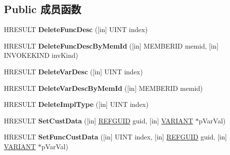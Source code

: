 \subsection*{Public 成员函数}
\begin{DoxyCompactItemize}
\item 
\mbox{\label{interface_i_create_type_info2_aff00ee6ebc79fa394288c17fcb8c0e08}} 
H\+R\+E\+S\+U\+LT {\bfseries Delete\+Func\+Desc} (\mbox{[}in\mbox{]} U\+I\+NT index)
\item 
\mbox{\label{interface_i_create_type_info2_a234f9b5e082de22db7f1b706aea32964}} 
H\+R\+E\+S\+U\+LT {\bfseries Delete\+Func\+Desc\+By\+Mem\+Id} (\mbox{[}in\mbox{]} M\+E\+M\+B\+E\+R\+ID memid, \mbox{[}in\mbox{]} I\+N\+V\+O\+K\+E\+K\+I\+ND inv\+Kind)
\item 
\mbox{\label{interface_i_create_type_info2_abe46aa69733e20059d33f987c8875ca0}} 
H\+R\+E\+S\+U\+LT {\bfseries Delete\+Var\+Desc} (\mbox{[}in\mbox{]} U\+I\+NT index)
\item 
\mbox{\label{interface_i_create_type_info2_a057efad7859c3f871d2eca8b4b846f03}} 
H\+R\+E\+S\+U\+LT {\bfseries Delete\+Var\+Desc\+By\+Mem\+Id} (\mbox{[}in\mbox{]} M\+E\+M\+B\+E\+R\+ID memid)
\item 
\mbox{\label{interface_i_create_type_info2_aee4b98e8a6a914bcd69d3650010afad2}} 
H\+R\+E\+S\+U\+LT {\bfseries Delete\+Impl\+Type} (\mbox{[}in\mbox{]} U\+I\+NT index)
\item 
\mbox{\label{interface_i_create_type_info2_a72c9a3d0d7e0fff408cf9f64ad4cd934}} 
H\+R\+E\+S\+U\+LT {\bfseries Set\+Cust\+Data} (\mbox{[}in\mbox{]} \hyperlink{struct___g_u_i_d}{R\+E\+F\+G\+U\+ID} guid, \mbox{[}in\mbox{]} \hyperlink{structtag_v_a_r_i_a_n_t}{V\+A\+R\+I\+A\+NT} $\ast$p\+Var\+Val)
\item 
\mbox{\label{interface_i_create_type_info2_adbe03656be46050f7600d06eeca0e4b6}} 
H\+R\+E\+S\+U\+LT {\bfseries Set\+Func\+Cust\+Data} (\mbox{[}in\mbox{]} U\+I\+NT index, \mbox{[}in\mbox{]} \hyperlink{struct___g_u_i_d}{R\+E\+F\+G\+U\+ID} guid, \mbox{[}in\mbox{]} \hyperlink{structtag_v_a_r_i_a_n_t}{V\+A\+R\+I\+A\+NT} $\ast$p\+Var\+Val)

\end{DoxyCompactItemize}
